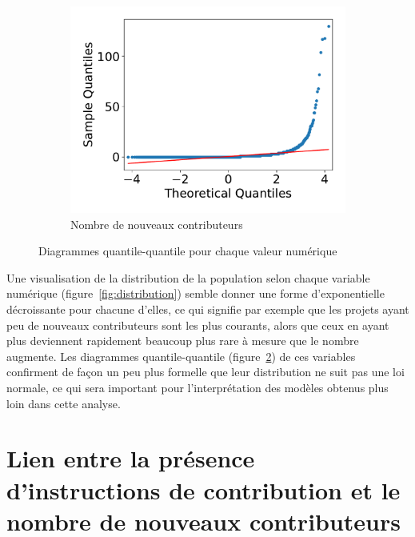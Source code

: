 \begin{figure}[ht]
\begin{subfigure}[t]{0.3\textwidth}
        \includegraphics[width=\textwidth]{../experiment/data_analysis/newContributorCount_qqplot}
        \caption{Nombre de nouveaux contributeurs}
        \label{sfig:newContributorQQplot}
    \end{subfigure}

    \caption{Diagrammes quantile-quantile pour chaque valeur numérique}
    \label{fig:qqplots}
\end{figure}

Une visualisation de la distribution de la population selon chaque variable numérique
(figure~\ref{fig:distribution}) semble donner une forme d'exponentielle décroissante pour chacune d'elles, ce
qui signifie par exemple que les projets ayant peu de nouveaux contributeurs sont les plus courants, alors que
ceux en ayant plus deviennent rapidement beaucoup plus rare à mesure que le nombre augmente. Les diagrammes
quantile-quantile (figure~\ref{fig:qqplots}) de ces variables confirment de façon un peu plus formelle que
leur distribution ne suit pas une loi normale, ce qui sera important pour l'interprétation des modèles obtenus
plus loin dans cette analyse.

\section{Lien entre la présence d'instructions de contribution et le nombre de nouveaux contributeurs}

